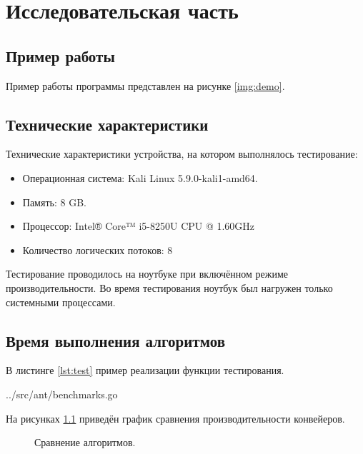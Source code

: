 \chapter{Исследовательская часть}

\section{Пример работы}

Пример работы программы представлен на рисунке \ref{img:demo}.


\section{Технические характеристики}

Технические характеристики устройства, на котором выполнялось тестирование:

\begin{itemize}
	\item Операционная система: Kali \cite{kali} Linux \cite{linux} 5.9.0-kali1-amd64.
	\item Память: 8 GB.
	\item Процессор: Intel® Core™ i5-8250U \cite{intel} CPU @ 1.60GHz
	\item Количество логических потоков: 8
\end{itemize}

Тестирование проводилось на ноутбуке при включённом режиме производительности. Во время тестирования ноутбук был нагружен только системными процессами.


\section{Время выполнения алгоритмов}

В листинге \ref{lst:test} пример реализации функции тестирования.

\begin{lstinputlisting}[
	caption={Функция тестирования},
	label={lst:test},
	style={go},
	linerange={31-59},
	]{../src/ant/benchmarks.go}
\end{lstinputlisting}

На рисунках \ref{plt:time} приведён график сравнения производительности конвейеров.

\begin{figure}[!h]
	\centering
	\captionsetup{justification=centering}
	\caption{Сравнение алгоритмов.}
	\label{plt:time}
\end{figure}

